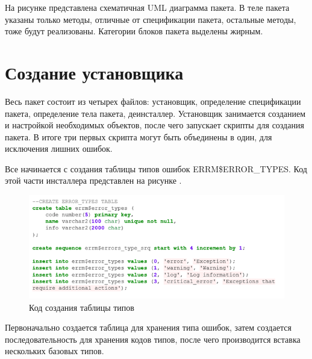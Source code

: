 На рисунке  представлена схематичная UML диаграмма пакета. В теле пакета указаны только методы, отличные от спецификации пакета, остальные методы, тоже будут реализованы. Категории блоков пакета выделены жирным. 


\section{Создание установщика} \label{ch3:sec6}

Весь пакет состоит из четырех файлов: установщик, определение спецификации пакета, определение тела пакета, деинсталлер. Установщик занимается созданием и настройкой необходимых объектов, после чего запускает скрипты для создания пакета. В итоге три первых скрипта могут быть объединены в один, для исключения лишних ошибок. 

Все начинается с создания таблицы типов ошибок ERRM\$ERROR\_TYPES. Код этой части инсталлера представлен на рисунке .

\begin{figure}[ht!] 
	\center
	\includegraphics [scale=1] {my_folder/img/C3_create_error_types_table.png}
	\caption{Код создания таблицы типов} 
	\label{fig:C3_create_error_types_table}  
\end{figure}
\FloatBarrier

Первоначально создается таблица для хранения типа ошибок, затем создается последовательность для хранения кодов типов, после чего производится вставка нескольких базовых типов. 

